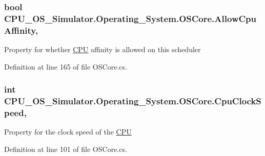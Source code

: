 \subsubsection[{Allow\+Cpu\+Affinity}]{\setlength{\rightskip}{0pt plus 5cm}bool C\+P\+U\+\_\+\+O\+S\+\_\+\+Simulator.\+Operating\+\_\+\+System.\+O\+S\+Core.\+Allow\+Cpu\+Affinity\hspace{0.3cm}{\ttfamily [get]}, {\ttfamily [set]}}\label{class_c_p_u___o_s___simulator_1_1_operating___system_1_1_o_s_core_a5086a047ca75af087039e9d45ea0a6cf}


Property for whether \hyperlink{namespace_c_p_u___o_s___simulator_1_1_c_p_u}{C\+P\+U} affinity is allowed on this scheduler 



Definition at line 165 of file O\+S\+Core.\+cs.

\hypertarget{class_c_p_u___o_s___simulator_1_1_operating___system_1_1_o_s_core_a1ea93a6cc37dbae4bc607d09fd6e75db}{}
\subsubsection[{Cpu\+Clock\+Speed}]{\setlength{\rightskip}{0pt plus 5cm}int C\+P\+U\+\_\+\+O\+S\+\_\+\+Simulator.\+Operating\+\_\+\+System.\+O\+S\+Core.\+Cpu\+Clock\+Speed\hspace{0.3cm}{\ttfamily [get]}, {\ttfamily [set]}}\label{class_c_p_u___o_s___simulator_1_1_operating___system_1_1_o_s_core_a1ea93a6cc37dbae4bc607d09fd6e75db}


Property for the clock speed of the \hyperlink{namespace_c_p_u___o_s___simulator_1_1_c_p_u}{C\+P\+U} 



Definition at line 101 of file O\+S\+Core.\+cs.

\hypertarget{class_c_p_u___o_s___simulator_1_1_operating___system_1_1_o_s_core_ac620c813df8b2c9ea386cff20d3fee84}{}
